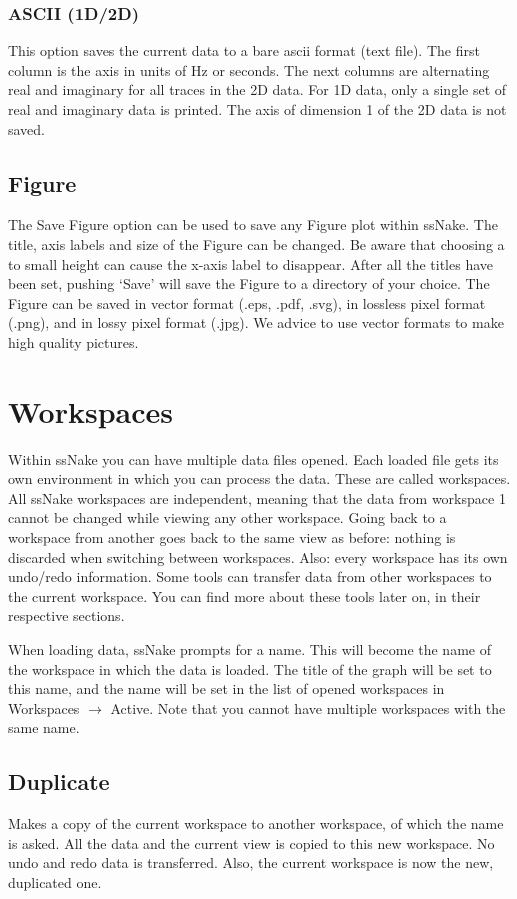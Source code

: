 \documentclass[11pt,a4paper]{article}
\begin{document}
\subsubsection*{ASCII (1D/2D)}
This option saves the current data to a bare ascii format (text file). The first column is the axis in units of Hz or seconds. The next columns are alternating real and imaginary for all traces in the 2D data. For 1D data, only a single set of real and imaginary data is printed. The axis of dimension 1 of the 2D data is not saved.

\subsection{Figure}
The Save Figure option can be used to save any Figure plot within ssNake. The title, axis labels and size of the Figure can be changed. Be aware that choosing a to small height can cause the x-axis label to disappear. After all the titles have been set, pushing `Save' will save the Figure to a directory of your choice. The Figure can be saved in vector format (.eps, .pdf, .svg), in lossless pixel format (.png), and in lossy pixel format (.jpg). We advice to use vector formats to make high quality pictures.


\section{Workspaces}
Within ssNake you can have multiple data files opened. Each loaded file gets its own environment in which you can process the data. These are called workspaces. All ssNake workspaces are independent, meaning that the data from workspace 1 cannot be changed while viewing any other workspace. Going back to a workspace from another goes back to the same view as before:  nothing is discarded when switching between workspaces. Also: every workspace has its own undo/redo information. Some tools can transfer data from other workspaces to the current workspace. You can find more about these tools later on, in their respective sections.

When loading data, ssNake prompts for a name. This will become the name of the workspace in which the data is loaded. The title of the graph will be set to this name, and the name will be set in the list of opened workspaces in Workspaces $\rightarrow$ Active. Note that you cannot have multiple workspaces with the same name.

\subsection{Duplicate}
Makes a copy of the current workspace to another workspace, of which the name is asked. All the data and the current view is copied to this new workspace. No undo and redo data is transferred. Also, the current workspace is now the new, duplicated one.
\end{document}
